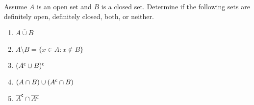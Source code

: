 \documentclass{lew98_solutions}
\begin{document}
\begin{exercise}
\label{ex:3.2.8}
    Assume \( A \) is an open set and \( B \) is a closed set. Determine if the following sets are definitely open, definitely closed, both, or neither.
    \begin{enumerate}
        \item \( \overline{A \cup B} \)

        \item \( A \setminus B = \{ x \in A : x \not\in B \} \)

        \item \( (A^{\mathsf{c}} \cup B)^{\mathsf{c}} \)

        \item \( (A \cap B) \cup (A^{\mathsf{c}} \cap B) \)

        \item \( \overline{A}^{\mathsf{c}} \cap \overline{A^{\mathsf{c}}} \)
    \end{enumerate}
\end{exercise}
\end{document}
